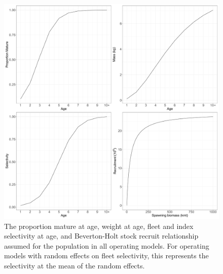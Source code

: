 \documentclass[
  12pt,
]{article}
\begin{document}
\begin{figure}[!ht]
\begin{center}
\includegraphics[width = \textwidth]{om_input_plots_figure}
\end{center}
\caption{The proportion mature at age, weight at age, fleet and index selectivity at age, and Beverton-Holt stock recruit relationship assumed for the population in all operating models. For operating models with random effects on fleet selectivity, this represents the selectivity at the mean of the random effects.}\label{om_inputs_fig}
\end{figure}

\clearpage
\end{document}
